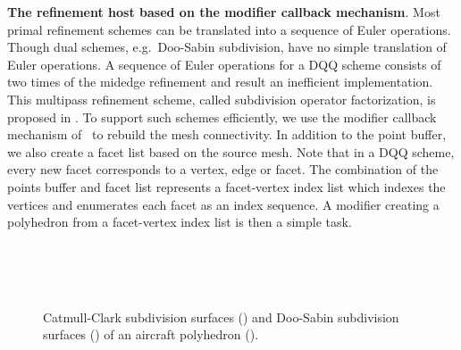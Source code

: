 \noindent\textbf{The refinement host based on the modifier callback mechanism}.
Most primal refinement schemes can be translated into a sequence of
Euler operations. Though dual schemes, e.g.\ Doo-Sabin subdivision,
have no simple translation of Euler operations. A sequence
of Euler operations for a DQQ scheme consists of two times 
of the midedge refinement \cite{Peters:1997:SSS} and 
result an inefficient implementation. This multipass 
refinement scheme, called subdivision operator factorization, 
is proposed in \cite{Peter:2003:CPDSS}.
To support such schemes efficiently, we use the modifier 
callback mechanism of \cgalpoly\ to rebuild the mesh
connectivity. In addition to the point buffer, we
also create a facet list based on the source mesh. Note that in a DQQ
scheme, every new facet corresponds to a vertex, edge or facet. The
combination of the points buffer and facet list represents a
facet-vertex index list which indexes the vertices and enumerates each
facet as an index sequence. A modifier creating a polyhedron from a
facet-vertex index list is then a simple task.

\begin{figure}
  \centering
   \\
  \\
  \\
  \caption{Catmull-Clark subdivision surfaces (\IL) and
  Doo-Sabin subdivision surfaces (\IR) 
  of an aircraft polyhedron (\IT).
  }
  \label{fig:SubExample}
\end{figure}

